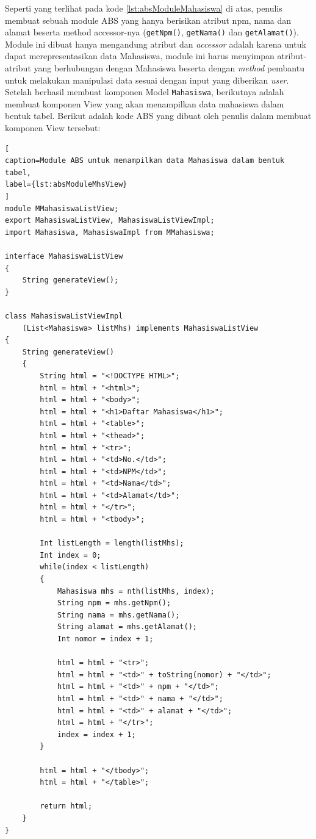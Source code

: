 Seperti yang terlihat pada kode \ref{lst:absModuleMahasiswa} di atas, penulis membuat sebuah module ABS yang hanya berisikan atribut npm, nama dan alamat beserta method accessor-nya (\texttt{getNpm()}, \texttt{getNama()} dan \texttt{getAlamat()}). Module ini dibuat hanya mengandung atribut dan \textit{accessor} adalah karena untuk dapat merepresentasikan data Mahasiswa, module ini harus menyimpan atribut-atribut yang berhubungan dengan Mahasiswa beserta dengan \textit{method} pembantu untuk melakukan manipulasi data sesuai dengan input yang diberikan \textit{user}.\\

Setelah berhasil membuat komponen Model \texttt{Mahasiswa}, berikutnya adalah membuat komponen View yang akan menampilkan data mahasiswa dalam bentuk tabel. Berikut adalah kode ABS yang dibuat oleh penulis dalam membuat komponen View tersebut:

\begin{lstlisting}[
caption=Module ABS untuk menampilkan data Mahasiswa dalam bentuk tabel,
label={lst:absModuleMhsView}
]
module MMahasiswaListView;
export MahasiswaListView, MahasiswaListViewImpl;
import Mahasiswa, MahasiswaImpl from MMahasiswa;

interface MahasiswaListView
{
	String generateView();
}

class MahasiswaListViewImpl
	(List<Mahasiswa> listMhs) implements MahasiswaListView
{
	String generateView()
	{
		String html = "<!DOCTYPE HTML>";
		html = html + "<html>";
		html = html + "<body>";
		html = html + "<h1>Daftar Mahasiswa</h1>";
		html = html + "<table>";
		html = html + "<thead>";
		html = html + "<tr>";
		html = html + "<td>No.</td>";
		html = html + "<td>NPM</td>";
		html = html + "<td>Nama</td>";
		html = html + "<td>Alamat</td>";
		html = html + "</tr>";
		html = html + "<tbody>";
		
		Int listLength = length(listMhs);
		Int index = 0;
		while(index < listLength)
		{
			Mahasiswa mhs = nth(listMhs, index);
			String npm = mhs.getNpm();
			String nama = mhs.getNama();
			String alamat = mhs.getAlamat();
			Int nomor = index + 1;
			
			html = html + "<tr>";
			html = html + "<td>" + toString(nomor) + "</td>";
			html = html + "<td>" + npm + "</td>";
			html = html + "<td>" + nama + "</td>";
			html = html + "<td>" + alamat + "</td>";
			html = html + "</tr>";
			index = index + 1;
		}
		
		html = html + "</tbody>";
		html = html + "</table>";
		
		return html;
	}
}
\end{lstlisting}

